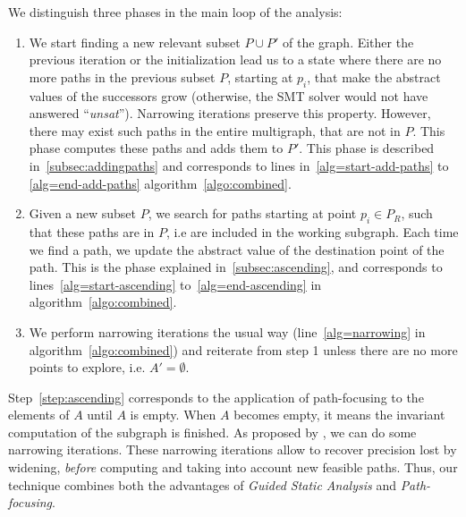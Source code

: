 \documentclass[preprint]{sigplanconf}
\newcommand{\MM}[1]{{\color{blue} TODO(MM): #1}}
\begin{document}
We distinguish three phases in the main loop of the analysis:
\begin{enumerate}
\item \label{step:addingpaths} We start finding a new relevant subset
  $P \cup P'$ of the graph.
  Either the previous iteration or the initialization lead us to a
  state where there are no more paths in the previous subset $P$,
  starting at $p_i$, that make the abstract values of the successors
  grow (otherwise, the SMT solver would not have answered
  ``\emph{unsat}''). Narrowing iterations preserve this property.
  However, there may exist such paths in the entire multigraph, that
  are not in $P$. This phase computes these paths and adds them to
  $P'$. This phase is described in~\ref{subsec:addingpaths}
  and corresponds to lines in~\ref{alg=start-add-paths} to
  \ref{alg=end-add-paths} algorithm~\ref{algo:combined}.
\item \label{step:ascending} Given a new subset $P$, we search for paths starting at point
  $p_i \in P_R$, such that these paths are in $P$, i.e are included in
  the working subgraph. Each time we find a path, we update the
  abstract value of the destination point of the path. This is the
  phase explained in~\ref{subsec:ascending}, and corresponds to
  lines~\ref{alg=start-ascending} to~\ref{alg=end-ascending} in
  algorithm~\ref{algo:combined}.
\item  \label{step:narrowing} We perform narrowing iterations the usual way
  (line~\ref{alg=narrowing} in algorithm~\ref{algo:combined}) and
  reiterate from step 1 unless there are no more points to explore,
  i.e. $A' = \emptyset$.
\end{enumerate}

%
%

Step~\ref{step:ascending} corresponds to the application of
path-focusing \cite{Monniaux_Gonnord_SAS11} to
the elements of $A$ until $A$ is empty. 
When $A$ becomes empty, it means the
invariant computation of the subgraph is finished. As proposed by
\citet{DBLP:conf/sas/GopanR07}, we can do some narrowing iterations.
These narrowing iterations allow to recover precision lost by
widening, \emph{before} computing and taking into account new feasible paths.
Thus, our technique combines both the advantages of \emph{Guided Static
Analysis} and \emph{Path-focusing}.
\end{document}

